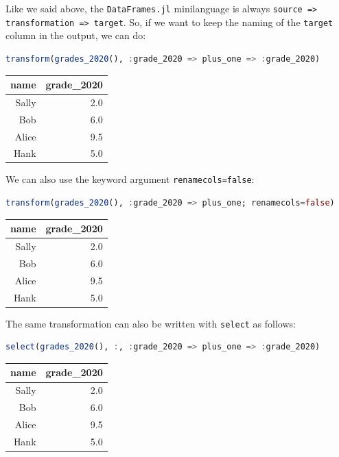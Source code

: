\documentclass[
  notoc %
]{tufte-book}
\newcommand{\passthrough}[1]{#1}
\begin{document}
Like we said above, the \passthrough{\lstinline!DataFrames.jl!}
minilanguage is always
\passthrough{\lstinline!source => transformation => target!}. So, if we
want to keep the naming of the \passthrough{\lstinline!target!} column
in the output, we can do:

\begin{lstlisting}[language=Julia]
transform(grades_2020(), :grade_2020 => plus_one => :grade_2020)
\end{lstlisting}

\begin{longtable}[]{@{}rr@{}}
\toprule
name & grade\_2020 \\
\midrule
\endhead
Sally & 2.0 \\
Bob & 6.0 \\
Alice & 9.5 \\
Hank & 5.0 \\
\bottomrule
\end{longtable}

We can also use the keyword argument
\passthrough{\lstinline!renamecols=false!}:

\begin{lstlisting}[language=Julia]
transform(grades_2020(), :grade_2020 => plus_one; renamecols=false)
\end{lstlisting}

\begin{longtable}[]{@{}rr@{}}
\toprule
name & grade\_2020 \\
\midrule
\endhead
Sally & 2.0 \\
Bob & 6.0 \\
Alice & 9.5 \\
Hank & 5.0 \\
\bottomrule
\end{longtable}

The same transformation can also be written with
\passthrough{\lstinline!select!} as follows:

\begin{lstlisting}[language=Julia]
select(grades_2020(), :, :grade_2020 => plus_one => :grade_2020)
\end{lstlisting}

\begin{longtable}[]{@{}rr@{}}
\toprule
name & grade\_2020 \\
\midrule
\endhead
Sally & 2.0 \\
Bob & 6.0 \\
Alice & 9.5 \\
Hank & 5.0 \\
\bottomrule
\end{longtable}
\end{document}
